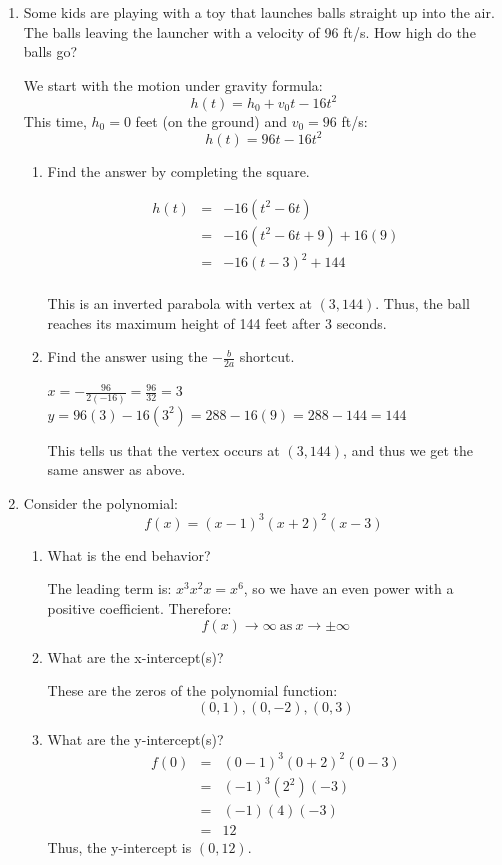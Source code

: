 \documentclass[letterpaper,12pt,fleqn]{article}
\begin{document}
\begin{enumerate}
\item Some kids are playing with a toy that launches balls straight up into
  the air. The balls leaving the launcher with a velocity of 96 ft/s. How high
  do the balls go?

  We start with the motion under gravity formula:
  \[h(t)=h_0+v_0t-16t^2\]
  This time, $h_0=0$ feet (on the ground) and $v_0=96$ ft/s:
  \[h(t)=96t-16t^2\]
  
  \begin{enumerate}
  \item Find the answer by completing the square.

    \begin{eqnarray*}
      h(t) &=& -16(t^2-6t) \\
      &=& -16(t^2-6t+9)+16(9) \\
      &=& -16(t-3)^2+144 \\
    \end{eqnarray*}

    This is an inverted parabola with vertex at $(3,144)$. Thus, the ball
    reaches its maximum height of 144 feet after 3 seconds.
    
  \item Find the answer using the $-\frac{b}{2a}$ shortcut.

    $x=-\frac{96}{2(-16)}=\frac{96}{32}=3$ \\
    $y=96(3)-16(3^2)=288-16(9)=288-144=144$

    This tells us that the vertex occurs at $(3,144)$, and thus we get the
    same answer as above.
  \end{enumerate}

\item Consider the polynomial:
  \[f(x)=(x-1)^3(x+2)^2(x-3)\]
  \begin{enumerate}
  \item What is the end behavior?

    The leading term is: $x^3x^2x=x^6$, so we have an even power with a
    positive coefficient. Therefore:
    \[f(x)\to\infty\ \mbox{as}\ x\to\pm\infty\]
    
  \item What are the x-intercept(s)?

    These are the zeros of the polynomial function:
    \[(0,1), (0,-2), (0,3)\]
    
  \item What are the y-intercept(s)?
    \begin{eqnarray*}
      f(0) &=& (0-1)^3(0+2)^2(0-3) \\
      &=& (-1)^3(2^2)(-3) \\
      &=& (-1)(4)(-3) \\
      &=& 12
    \end{eqnarray*}
    Thus, the y-intercept is $(0,12)$.
    

\end{enumerate}
\end{enumerate}
\end{document}
